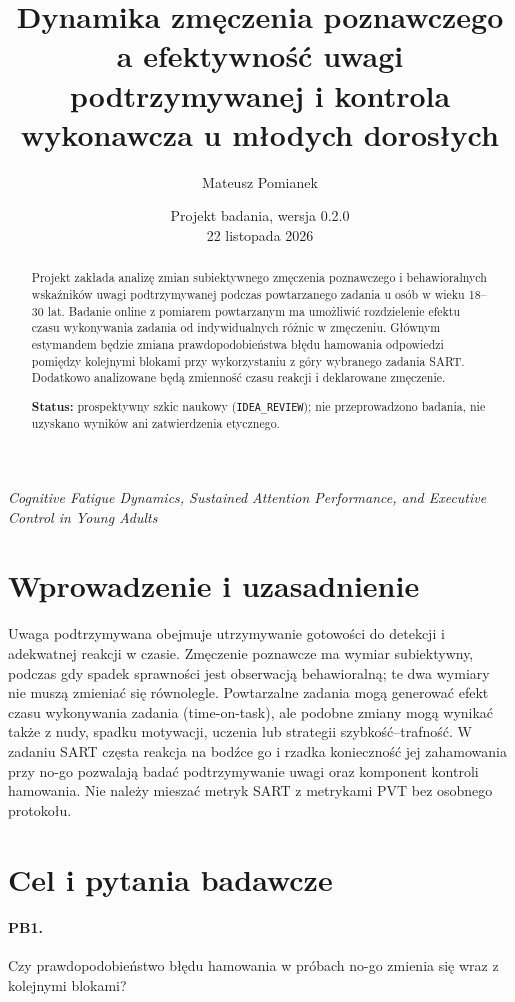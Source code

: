 \documentclass[11pt,a4paper]{article}
\title{Dynamika zmęczenia poznawczego a efektywność uwagi podtrzymywanej i kontrola wykonawcza u młodych dorosłych}
\author{Mateusz Pomianek}
\date{Projekt badania, wersja 0.2.0 \\ 22 listopada 2026}
\begin{document}
\maketitle
\begin{center}
\textit{Cognitive Fatigue Dynamics, Sustained Attention Performance, and Executive Control in Young Adults}
\end{center}
\begin{abstract}
Projekt zakłada analizę zmian subiektywnego zmęczenia poznawczego i behawioralnych wskaźników uwagi podtrzymywanej podczas powtarzanego zadania u osób w wieku 18--30 lat. Badanie online z pomiarem powtarzanym ma umożliwić rozdzielenie efektu czasu wykonywania zadania od indywidualnych różnic w zmęczeniu. Głównym estymandem będzie zmiana prawdopodobieństwa błędu hamowania odpowiedzi pomiędzy kolejnymi blokami przy wykorzystaniu z góry wybranego zadania SART. Dodatkowo analizowane będą zmienność czasu reakcji i deklarowane zmęczenie.

\textbf{Status:} prospektywny szkic naukowy (\texttt{IDEA\_REVIEW}); nie przeprowadzono badania, nie uzyskano wyników ani zatwierdzenia etycznego.
\end{abstract}
\tableofcontents
\section{Wprowadzenie i uzasadnienie}
Uwaga podtrzymywana obejmuje utrzymywanie gotowości do detekcji i adekwatnej reakcji w czasie. Zmęczenie poznawcze ma wymiar subiektywny, podczas gdy spadek sprawności jest obserwacją behawioralną; te dwa wymiary nie muszą zmieniać się równolegle. Powtarzalne zadania mogą generować efekt czasu wykonywania zadania (time-on-task), ale podobne zmiany mogą wynikać także z nudy, spadku motywacji, uczenia lub strategii szybkość--trafność. W zadaniu SART częsta reakcja na bodźce go i rzadka konieczność jej zahamowania przy no-go pozwalają badać podtrzymywanie uwagi oraz komponent kontroli hamowania. Nie należy mieszać metryk SART z metrykami PVT bez osobnego protokołu.
\section{Cel i pytania badawcze}
\paragraph{PB1.} Czy prawdopodobieństwo błędu hamowania w próbach no-go zmienia się wraz z kolejnymi blokami?
\end{document}
